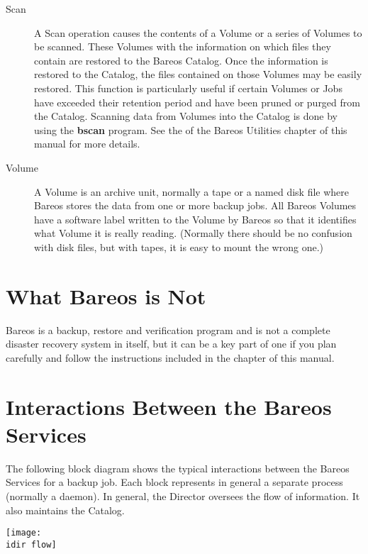 \begin{description}
\item [Scan]
   A Scan operation causes the contents of a Volume or a series of Volumes
   to be scanned.  These Volumes with the information on which files they
   contain are restored to the Bareos Catalog.  Once the information is
   restored to the Catalog, the files contained on those Volumes may be
   easily restored.  This function is particularly useful if certain
   Volumes or Jobs have exceeded their retention period and have been
   pruned or purged from the Catalog.  Scanning data from Volumes into the
   Catalog is done by using the {\bf bscan} program.  See the  of the Bareos Utilities chapter of this manual for more
   details.

\item [Volume]
   A Volume is an archive unit, normally a tape or a named disk file where
   Bareos stores the data from one or more backup jobs.  All Bareos Volumes
   have a software label written to the Volume by Bareos so that it
   identifies what Volume it is really reading.  (Normally there should be
   no confusion with disk files, but with tapes, it is easy to mount the
   wrong one.)
\end{description}

\section{What Bareos is Not}

Bareos is a backup, restore and verification program and is not a
complete disaster recovery system in itself, but it can be a key part of one
if you plan carefully and follow the instructions included in the
 chapter of this manual.

\section{Interactions Between the Bareos Services}

The following block diagram shows the typical interactions between the Bareos
Services for a backup job. Each block represents in general a separate process
(normally a daemon). In general, the Director oversees the flow of
information. It also maintains the Catalog.

\begin{center}
\texttt{[image: \\idir flow]}
\end{center}